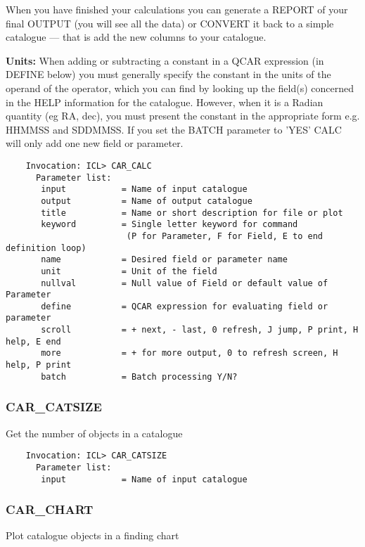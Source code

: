 When you have finished your calculations you can generate a REPORT of
your final OUTPUT (you will see all the data) or CONVERT it back to a
simple catalogue --- that is add the new columns to your catalogue.

{\bf Units:} When adding or subtracting a constant in a QCAR expression (in
DEFINE below) you must generally specify the constant in the units of the 
operand of the operator, which you can find by looking up the field(s) concerned
in the HELP information for the catalogue.
However, when it is a Radian quantity (eg RA, dec), you must present the
constant in the appropriate form e.g. HHMMSS and SDDMMSS.
If you set the BATCH parameter to 'YES' CALC will only add one new field or
parameter.

\begin{verbatim}
    Invocation: ICL> CAR_CALC
      Parameter list:
       input           = Name of input catalogue
       output          = Name of output catalogue
       title           = Name or short description for file or plot
       keyword         = Single letter keyword for command
                        (P for Parameter, F for Field, E to end definition loop)
       name            = Desired field or parameter name
       unit            = Unit of the field
       nullval         = Null value of Field or default value of Parameter
       define          = QCAR expression for evaluating field or parameter
       scroll          = + next, - last, 0 refresh, J jump, P print, H help, E end
       more            = + for more output, 0 to refresh screen, H help, P print
       batch           = Batch processing Y/N?
\end{verbatim}

\subsubsection{CAR\_CATSIZE}

Get the number of objects in a catalogue

\begin{verbatim}
    Invocation: ICL> CAR_CATSIZE
      Parameter list:
       input           = Name of input catalogue
\end{verbatim}

\subsubsection{CAR\_CHART}
 
Plot catalogue objects in a finding chart

